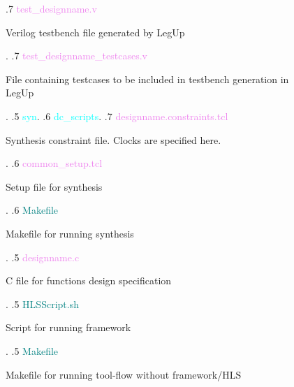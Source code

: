 \begin{figure}
\begin{minipage}{0.99\textwidth}
{    .7 \textcolor{violet}{test\_designname{.}v} \dotfill \:\:\begin{minipage}[t]{5.4cm}
                                                    Verilog testbench file generated by LegUp
                                                    \end{minipage}.
    .7 \textcolor{violet}{test\_designname\_testcases{.}v} \dotfill \:\:\begin{minipage}[t]{5.4cm}
                                                    File containing testcases to be included in testbench generation in LegUp
                                                    \end{minipage}.
    .5 \textcolor{cyan}{syn}.
    .6 \textcolor{cyan}{dc\_scripts}.
    .7 \textcolor{violet}{designname{.}constraints{.}tcl} \dotfill \:\:\begin{minipage}[t]{5.4cm}
                                                            Synthesis constraint file{.} Clocks are specified here{.}
                                                            \end{minipage}.
    .6 \textcolor{violet}{common\_setup{.}tcl} \dotfill \:\:\begin{minipage}[t]{5.4cm}
                                                            Setup file for synthesis 
                                                            \end{minipage}.
    .6 \textcolor{teal}{Makefile} \dotfill \:\:\begin{minipage}[t]{5.4cm}
                                                            Makefile for running synthesis
                                                            \end{minipage}.
    .5 \textcolor{violet}{designname{.}c} \dotfill \:\:\begin{minipage}[t]{5.4cm}
                                                            C file for functions design specification
                                                            \end{minipage}.
    .5 \textcolor{teal}{HLSScript{.}sh} \dotfill \:\:\begin{minipage}[t]{5.4cm}
                                                            Script for running framework
                                                            \end{minipage}. 
    .5 \textcolor{teal}{Makefile} \dotfill \:\:\begin{minipage}[t]{5.4cm}
                                                            Makefile for running tool-flow without framework/HLS

\end{minipage}}
\end{minipage}
\end{figure}
